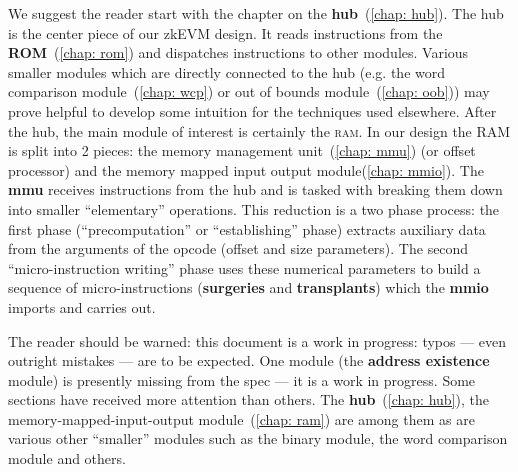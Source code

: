 We suggest the reader start with the chapter on the \textbf{hub}~(\ref{chap: hub}).
The hub is the center piece of our zkEVM design.
It reads instructions from the \textbf{ROM}~(\ref{chap: rom}) and dispatches instructions to other modules.
Various smaller modules which are directly connected to the hub (e.g. the word comparison module~(\ref{chap: wcp}) or out of bounds module~(\ref{chap: oob})) may prove helpful to develop some intuition for the techniques used elsewhere.
After the hub, the main module of interest is certainly the \textsc{ram}.
In our design the RAM is split into 2 pieces: the memory management unit~(\ref{chap: mmu}) (or offset processor) and the memory mapped input output module(\ref{chap: mmio}).
The \textbf{mmu} receives instructions from the hub and is tasked with breaking them down into smaller ``elementary'' operations.
This reduction is a two phase process: the first phase (``precomputation'' or ``establishing'' phase) extracts auxiliary data from the arguments of the opcode (offset and size parameters).
The second ``micro-instruction writing'' phase uses these numerical parameters to build a sequence of micro-instructions (\textbf{surgeries} and \textbf{transplants}) which the \textbf{mmio} imports and carries out.

The reader should be warned: this document is a work in progress: typos --- even outright mistakes --- are to be expected.
One module (the \textbf{address existence} module) is presently missing from the spec --- it is a work in progress.
Some sections have received more attention than others.
The \textbf{hub}~(\ref{chap: hub}), the memory-mapped-input-output module~(\ref{chap: ram}) are among them as are various other ``smaller'' modules such as the binary module, the word comparison module and others.
